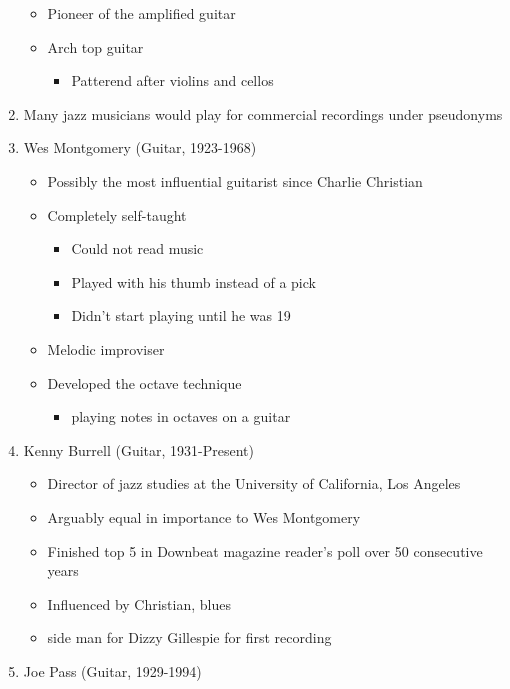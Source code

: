 \documentclass[]{article}
\providecommand{\tightlist}{%
  \setlength{\itemsep}{0pt}\setlength{\parskip}{0pt}}
\begin{document}
\begin{enumerate}
  \begin{itemize}
  \tightlist
  \item
    Pioneer of the amplified guitar
  \item
    Arch top guitar

    \begin{itemize}
    \tightlist
    \item
      Patterend after violins and cellos
    \end{itemize}
  \end{itemize}
\item
  Many jazz musicians would play for commercial recordings under
  pseudonyms
\item
  Wes Montgomery (Guitar, 1923-1968)

  \begin{itemize}
  \tightlist
  \item
    Possibly the most influential guitarist since Charlie Christian
  \item
    Completely self-taught

    \begin{itemize}
    \tightlist
    \item
      Could not read music
    \item
      Played with his thumb instead of a pick
    \item
      Didn't start playing until he was 19
    \end{itemize}
  \item
    Melodic improviser
  \item
    Developed the octave technique

    \begin{itemize}
    \tightlist
    \item
      playing notes in octaves on a guitar
    \end{itemize}
  \end{itemize}
\item
  Kenny Burrell (Guitar, 1931-Present)

  \begin{itemize}
  \tightlist
  \item
    Director of jazz studies at the University of California, Los
    Angeles
  \item
    Arguably equal in importance to Wes Montgomery
  \item
    Finished top 5 in Downbeat magazine reader's poll over 50
    consecutive years
  \item
    Influenced by Christian, blues
  \item
    side man for Dizzy Gillespie for first recording
  \end{itemize}
\item
  Joe Pass (Guitar, 1929-1994)


\end{enumerate}
\end{document}
